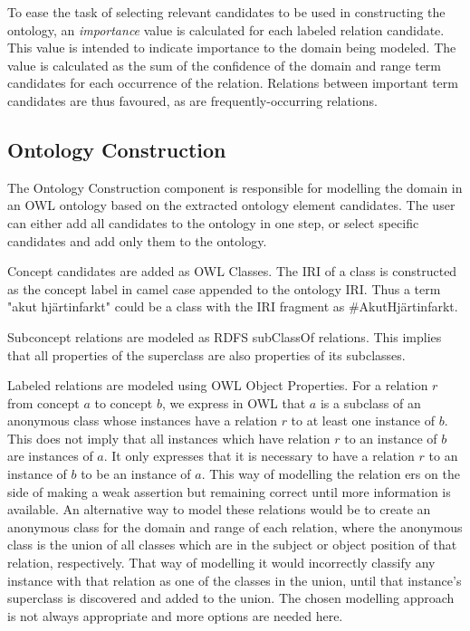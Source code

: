 \documentclass[a4paper]{report}
\begin{document}
To ease the task of selecting relevant candidates to be used in constructing the ontology, an \emph{importance} value is calculated for each labeled relation candidate.
This value is intended to indicate importance to the domain being modeled.
The value is calculated as the sum of the confidence of the domain and range term candidates for each occurrence of the relation.
Relations between important term candidates are thus favoured, as are frequently-occurring relations.

\subsection{Ontology Construction}

The Ontology Construction component is responsible for modelling the domain in an OWL ontology based on the extracted ontology element candidates.
The user can either add all candidates to the ontology in one step, or select specific candidates and add only them to the ontology.

Concept candidates are added as OWL Classes.
The IRI of a class is constructed as the concept label in camel case appended to the ontology IRI.
Thus a term "akut hjärtinfarkt" could be a class with the IRI fragment as \#AkutHjärtinfarkt.

Subconcept relations are modeled as RDFS subClassOf relations.
This implies that all properties of the superclass are also properties of its subclasses.

Labeled relations are modeled using OWL Object Properties.
For a relation \(r\) from concept \(a\) to concept \(b\), we express in OWL that \(a\) is a subclass of an anonymous class whose instances have a relation \(r\) to at least one instance of \(b\).
This does not imply that all instances which have relation \(r\) to an instance of \(b\) are instances of \(a\).
It only expresses that it is necessary to have a relation \(r\) to an instance of \(b\) to be an instance of \(a\).
This way of modelling the relation ers on the side of making a weak assertion but remaining correct until more information is available.
An alternative way to model these relations would be to create an anonymous class for the domain and range of each relation, where the anonymous class is the union of all classes which are in the subject or object position of that relation, respectively.
That way of modelling it would incorrectly classify any instance with that relation as one of the classes in the union, until that instance's superclass is discovered and added to the union.
The chosen modelling approach is not always appropriate and more options are needed here.
\end{document}

